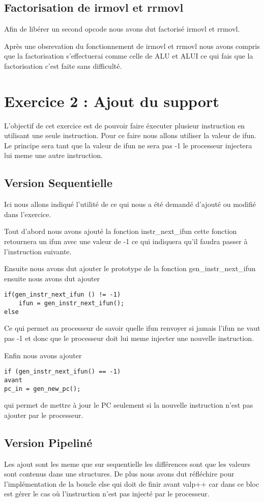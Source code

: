 \documentclass[12pt]{article}
\begin{document}
\subsection{Factorisation de irmovl et rrmovl}
Afin de libérer un second opcode nous avons dut factorisé irmovl et rrmovl.

Après une obsrevation du fonctionnement de irmovl et rrmovl nous avons compris que la factorisation s'effectuerai comme celle de ALU et ALUI ce qui fais que la factorisation c'est faite sans difficulté.

\newpage

\section{Exercice 2 : Ajout du support}

L'objectif de cet exercice est de pouvoir faire éxecuter plusieur instruction en utilisant une seule instruction. Pour ce faire nous allons utiliser la valeur de ifun. Le principe sera tant que la valeur de ifun ne sera pas -1 le processeur injectera lui meme une autre instruction.

\subsection{Version Sequentielle}
Ici nous allons indiqué l'utilité de ce qui nous a été demandé d'ajouté ou modifié dans l'exercice.

Tout d'abord nous avons  ajouté la fonction instr\_next\_ifun cette fonction retournera un ifun avec une valeur de -1 ce qui indiquera qu'il faudra passer à l'instruction suivante.

Ensuite nous avons dut ajouter le prototype de la fonction gen\_instr\_next\_ifun ensuite nous avons dut ajouter 
\begin{verbatim}
if(gen_instr_next_ifun () != -1)
	ifun = gen_instr_next_ifun();
else
\end{verbatim}
Ce qui permet au processeur de savoir quelle ifun renvoyer si jamais l'ifun ne vaut pas -1 et donc que le processeur doit lui meme injecter une nouvelle instruction.

Enfin nous avons ajouter 
\begin{verbatim}
if (gen_instr_next_ifun() == -1)
avant
pc_in = gen_new_pc();
\end{verbatim}
qui permet de mettre à jour le PC seulement si la nouvelle instruction n'est pas ajouter par le processeur.

\subsection{Version Pipeliné}
Les ajout sont les meme que sur sequentielle les différences sont que les valeurs sont contenus dans une structures. De plus nous avons dut réfléchire pour l'implémentation de la boucle else qui doit de finir avant valp++ car dans ce bloc est gérer le cas où l'instruction n'est pas injecté par le processeur.
\end{document}
